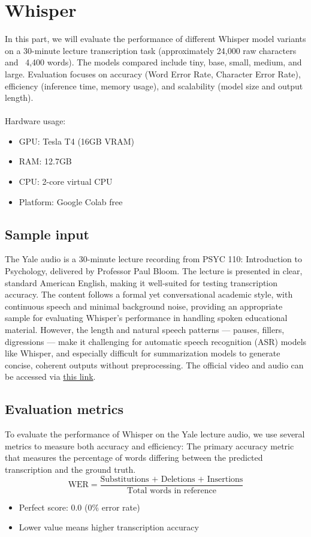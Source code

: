 \section{Whisper}
In this part, we will evaluate the performance of different Whisper model variants on a 30-minute lecture transcription task (approximately 24,000 raw characters and ~4,400 words). The models compared include tiny, base, small, medium, and large. Evaluation focuses on accuracy (Word Error Rate, Character Error Rate), efficiency (inference time, memory usage), and scalability (model size and output length).\\\\
Hardware usage:
\begin{itemize}
    \item GPU: Tesla T4 (16GB VRAM)
    \item RAM: 12.7GB
    \item CPU: 2-core virtual CPU
    \item Platform: Google Colab free
\end{itemize}

\subsection{Sample input}
The Yale audio is a 30-minute lecture recording from PSYC 110: Introduction to Psychology, delivered by Professor Paul Bloom. The lecture is presented in clear, standard American English, making it well-suited for testing transcription accuracy. The content follows a formal yet conversational academic style, with continuous speech and minimal background noise, providing an appropriate sample for evaluating Whisper’s performance in handling spoken educational material. However, the length and natural speech patterns — pauses, fillers, digressions — make it challenging for automatic speech recognition (ASR) models like Whisper, and especially difficult for summarization models to generate concise, coherent outputs without preprocessing.
The official video and audio can be accessed via \href{https://oyc.yale.edu/psychology/psyc-110/lecture-1}{this link}.

\subsection{Evaluation metrics}
To evaluate the performance of Whisper on the Yale lecture audio, we use several metrics to measure both accuracy and efficiency:
The primary accuracy metric that measures the percentage of words differing between the predicted transcription and the ground truth.
    \[
\text{WER} = \frac{\text{Substitutions + Deletions + Insertions}}{\text{Total words in reference}}
\]
\begin{itemize}
    \item Perfect score: 0.0 (0\% error rate)
    \item Lower value means higher transcription accuracy
\end{itemize}

